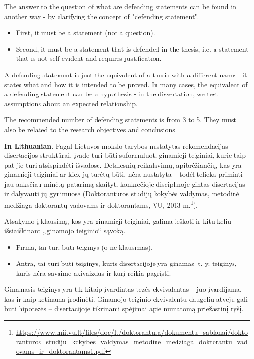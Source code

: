 The answer to the question of what are defending statements can be found in another way - by clarifying the concept of "defending statement".
\begin{itemize}
    \item First, it must be a statement (not a question).
    \item Second, it must be a statement that is defended in the thesis, i.e. a statement that is not self-evident and requires justification. 
\end{itemize}
A defending statement is just the equivalent of a thesis with a different name - it states what and how it is intended to be proved.
In many cases, the equivalent of a defending statement can be a hypothesis - in the dissertation, we test assumptions about an expected relationship.

The recommended number of defending statements is from 3 to 5. They must also be related to the research objectives and conclusions.

\textbf{In Lithuanian}. 
Pagal  Lietuvos  mokslo  tarybos  nustatytas  rekomendacijas  disertacijos struktūrai, įvade turi būti suformuluoti ginamieji teiginiai, kurie taip pat jie turi atsispindėti išvadose. 
Detalesnių reikalavimų, apibrėžiančių, kas  yra  ginamieji  teiginiai  ar kiek jų  turėtų būti,  nėra nustatyta – todėl telieka priminti jau anksčiau minėtą patarimą skaityti konkrečioje disciplinoje gintas disertacijas ir dalyvauti jų gynimuose (Doktorantūros studijų kokybės valdymas, metodinė medžiaga doktorantų vadovams ir doktorantams, VU, 2013 m.\footnote{\url{https://www.mii.vu.lt/files/doc/lt/doktorantura/dokumentu_sablonai/doktoranturos_studiju_kokybes_valdymas_metodine_medziaga_doktorantu_vadovams_ir_doktorantams1.pdf}
}).

Atsakymo į klausimą, kas yra ginamieji teiginiai, galima ieškoti ir kitu keliu – išsiaiškinant „ginamojo teiginio“ sąvoką. 
\begin{itemize}
    \item Pirma, tai turi būti teiginys (o ne klausimas). 
    \item Antra, tai turi būti teiginys, kuris disertacijoje yra ginamas, t. y. teiginys, kuris nėra savaime akivaizdus ir kurį reikia pagrįsti. 
\end{itemize}
Ginamasis teiginys yra tik kitaip įvardintas tezės ekvivalentas – juo įvardijama, kas ir kaip ketinama įrodinėti. 
Ginamojo teiginio ekvivalentu daugeliu atveju gali būti hipotezės – disertacijoje tikrinami spėjimai apie numatomą priežastinį ryšį.

